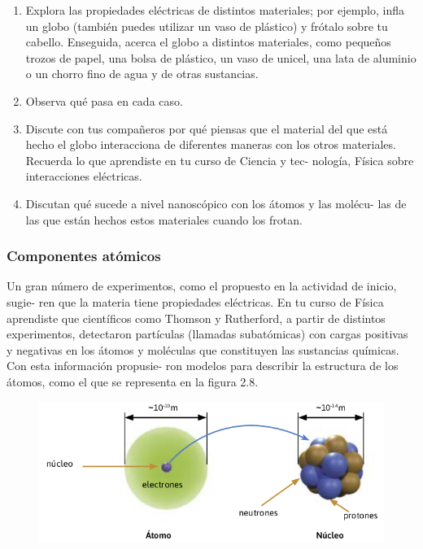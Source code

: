 \documentclass[11pt]{book}
\begin{document}
\begin{boxK}
  \begin{enumerate}
    \item Explora las propiedades eléctricas de distintos materiales; por ejemplo, infla un globo
          (también puedes utilizar un vaso de plástico) y frótalo sobre tu cabello. Enseguida,
          acerca el globo a distintos materiales, como pequeños trozos de papel,
          una bolsa de plástico, un vaso de unicel, una lata de aluminio o un
          chorro fino de agua y de otras sustancias.
    \item Observa qué pasa en cada caso.
    \item Discute con tus compañeros por qué piensas que el material del que
          está hecho el globo interacciona de diferentes maneras con los otros
          materiales. Recuerda lo que aprendiste en tu curso de Ciencia y tec-
          nología, Física sobre interacciones eléctricas.
    \item Discutan qué sucede a nivel nanoscópico con los átomos y las molécu-
          las de las que están hechos estos materiales cuando los frotan.
  \end{enumerate}

\end{boxK}

\subsubsection{Componentes atómicos}

Un gran número de experimentos, como el propuesto en la actividad de inicio, sugie-
ren que la materia tiene propiedades eléctricas. En tu curso de Física aprendiste que
científicos como Thomson y Rutherford, a partir de distintos experimentos, detectaron
partículas (llamadas subatómicas) con cargas positivas y negativas en los átomos
y moléculas que constituyen las sustancias químicas. Con esta información propusie-
ron modelos para describir la estructura de los átomos, como el que se representa en
la figura 2.8.\\

\begin{figure}[H]
  \centering
  \includegraphics[width=0.7\linewidth]{atomos08.png}
  \label{tab:atomos08}
\end{figure}%
\end{document}
